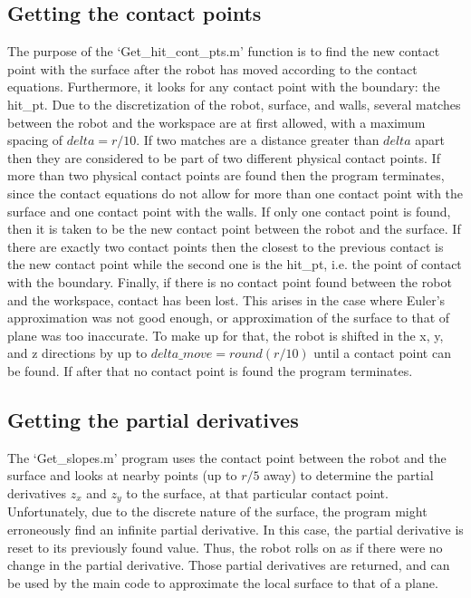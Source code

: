 \documentclass[journal]{IEEEtran}
\begin{document}
\subsection{Getting the contact points}
The purpose of the `Get\_hit\_cont\_pts.m' function is to find the new contact point with the surface after the robot has moved according to the contact equations. Furthermore, it looks for any contact point with the boundary: the hit\_pt. Due to the discretization of the robot, surface, and walls, several matches between the robot and the workspace are at first allowed, with a maximum spacing of $delta = r/10$. If two matches are a distance greater than $delta$ apart then they are considered to be part of two different physical contact points. If more than two physical contact points are found then the program terminates, since the contact equations do not allow for more than one contact point with the surface and one contact point with the walls. If only one contact point is found, then it is taken to be the new contact point between the robot and the surface. If there are exactly two contact points then the closest to the previous contact is the new contact point while the second one is the hit\_pt, i.e. the point of contact with the boundary. Finally, if there is no contact point found between the robot and the workspace, contact has been lost. This arises in the case where Euler's approximation was not good enough, or approximation of the surface to that of plane was too inaccurate. To make up for that, the robot is shifted in the x, y, and z directions by up to $delta\_move = round(r/10)$ until a contact point can be found. If after that no contact point is found the program terminates.
\subsection{Getting the partial derivatives}
The `Get\_slopes.m' program uses the contact point between the robot and the surface and looks at nearby points (up to $r/5$ away) to determine the partial derivatives $z_x$ and $z_y$ to the surface, at that particular contact point. Unfortunately, due to the discrete nature of the surface, the program might erroneously find an infinite partial derivative. In this case, the partial derivative is reset to its previously found value. Thus, the robot rolls on as if there were no change in the partial derivative. Those partial derivatives are returned, and can be used by the main code to approximate the local surface to that of a plane.
\end{document}
